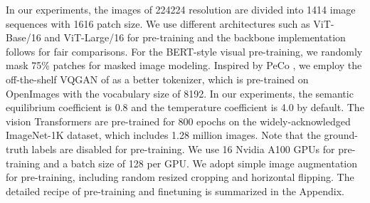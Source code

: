 \documentclass[runningheads]{llncs}
\begin{document}
In our experiments, the images of 224224 resolution are divided into 1414 image sequences with 1616 patch size. We use different architectures such as ViT-Base/16 and ViT-Large/16 for pre-training and the backbone implementation follows \cite{vit} for fair comparisons. 
For the BERT-style visual pre-training, we randomly mask 75\% patches for masked image modeling. Inspired by PeCo \cite{peco}, we employ the off-the-shelf VQGAN of \cite{taming} as a better tokenizer, which is pre-trained on OpenImages \cite{OpenImages2} with the vocabulary size of 8192. In our experiments, the semantic equilibrium coefficient  is 0.8 and the temperature coefficient  is 4.0 by default. The vision Transformers are pre-trained for 800 epochs on the widely-acknowledged ImageNet-1K \cite{imagenet1k} dataset, which includes 1.28 million images. Note that the ground-truth labels are disabled for pre-training. We use 16 Nvidia A100 GPUs for pre-training and a batch size of 128 per GPU. We adopt simple image augmentation for pre-training, including random resized cropping and horizontal flipping. 
The detailed recipe of pre-training and finetuning is summarized in the Appendix.
\end{document}

